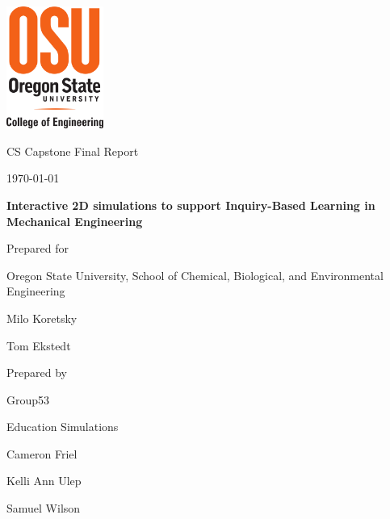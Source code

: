 \documentclass[onecolumn, draftclsnofoot,10pt, compsoc]{IEEEtran}
\def \CapstoneTeamName{Education Simulations}
\def \CapstoneTeamNumber{53}
\def \GroupMemberOne{Cameron Friel}
\def \GroupMemberTwo{Kelli Ann Ulep}
\def \GroupMemberThree{Samuel Wilson}
\def \CapstoneProjectName{Interactive 2D simulations to support Inquiry-Based Learning in Mechanical Engineering}
\def \CapstoneSponsorCompany{Oregon State University, School of Chemical, Biological, and Environmental Engineering}
\def \CapstoneSponsorPersonOne{Milo Koretsky}
\def \CapstoneSponsorPersonTwo{Tom Ekstedt}
\newcommand{\NameSigPair}[1]{\par
\makebox[2.75in][r]{#1} \hfil 	\makebox[3.25in]{\makebox[2.25in]{\hrulefill} \hfill		\makebox[.75in]{\hrulefill}}
\par\vspace{-12pt} \textit{\tiny\noindent
\makebox[2.75in]{} \hfil		\makebox[3.25in]{\makebox[2.25in][r]{Signature} \hfill	\makebox[.75in][r]{Date}}}}
\renewcommand{\NameSigPair}[1]{#1}
\begin{document}
\begin{titlepage}
    \begin{singlespace}
    	\includegraphics[height=4cm]{coe_v_spot1.png}
        \hfill 
        \par\vspace{.2in}
        \centering
        \scshape{
            \huge CS Capstone Final Report \par
            {\large\today}\par
            \vspace{.5in}
            \textbf{\Huge\CapstoneProjectName}\par
            \vfill
            {\large Prepared for}\par
            \Huge \CapstoneSponsorCompany\par
            \vspace{5pt}
            {\Large
                \NameSigPair{\CapstoneSponsorPersonOne}\par
                \NameSigPair{\CapstoneSponsorPersonTwo}\par
            }
            {\large Prepared by }\par
            Group\CapstoneTeamNumber\par
            \CapstoneTeamName\par 
            \vspace{5pt}
            {\Large
                \NameSigPair{\GroupMemberOne}\par
                \NameSigPair{\GroupMemberTwo}\par
                \NameSigPair{\GroupMemberThree}\par
            }
            \vspace{20pt}
        }
        \begin{abstract}

\end{abstract}
\end{singlespace}
\end{titlepage}
\end{document}
